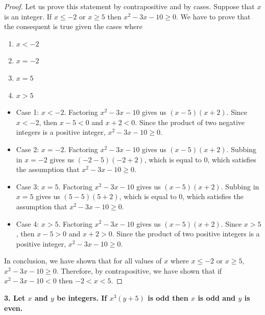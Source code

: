 \documentclass{report}
\theoremstyle{mytheoremstyle}
\theoremstyle{mytheoremstyle}
\theoremstyle{myproblemstyle}
\begin{document}
\begin{proof}
Let us prove this statement by contrapositive and by cases. Suppose that $x$ is an integer. If $x \leq -2$ or $x \geq 5$ then $x^2-3x-10 \geq 0$. We have to prove that the consequent is true given the cases where 
\begin{enumerate}
    \item $x < -2$
    \item $x = -2$
    \item $x = 5$
    \item $x > 5$
\end{enumerate}
\begin{itemize}
    \item Case 1: $x < -2$. Factoring $x^2-3x-10$ gives us $(x-5)(x+2)$. Since $x < -2$, then $x-5 < 0$ and $x+2 < 0$. Since the product of two negative integers is a positive integer, $x^2-3x-10 \geq 0$.
    \item Case 2: $x = -2$. Factoring $x^2-3x-10$ gives us $(x-5)(x+2)$. Subbing in $x=-2$ gives us $(-2-5)(-2+2)$, which is equal to $0$, which satisfies the assumption that $x^2-3x-10 \geq 0$.
    \item Case 3: $x = 5$. Factoring $x^2-3x-10$ gives us $(x-5)(x+2)$. Subbing in $x=5$ gives us $(5-5)(5+2)$, which is equal to $0$, which satisfies the assumption that $x^2-3x-10 \geq 0$.
    \item Case 4: $x > 5$. Factoring $x^2-3x-10$ gives us $(x-5)(x+2)$. Since $x > 5$, then $x-5 > 0$ and $x+2 > 0$. Since the product of two positive integers is a positive integer, $x^2-3x-10 \geq 0$.
\end{itemize}
In conclusion, we have shown that for all values of $x$ where $x \leq -2$ or $x \geq 5$, $x^2-3x-10 \geq 0$. Therefore, by contrapositive, we have shown that if $x^2-3x-10<0$ then $-2<x<5$.
\end{proof}
\textbf{3. Let $x$ and $y$ be integers. If $x^3(y+5)$ is odd then $x$ is odd and $y$ is even.}
\end{document}

